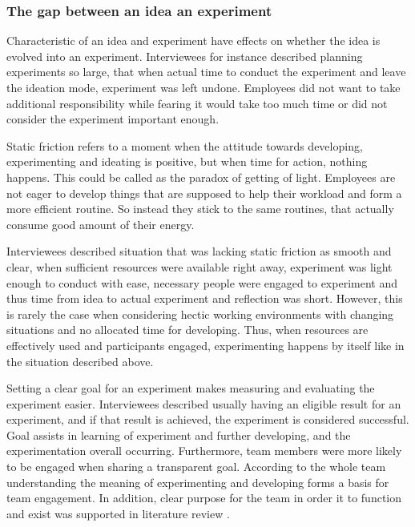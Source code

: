 \subsubsection*{The gap between an idea an experiment}
Characteristic of an idea and experiment have effects on whether the idea is evolved into an experiment. Interviewees for instance described planning experiments so large, that when actual time to conduct the experiment and leave the ideation mode, experiment was left undone. Employees did not want to take additional responsibility while fearing it would take too much time or did not consider the experiment important enough.

Static friction refers to a moment when the attitude towards developing, experimenting and ideating is positive, but when time for action, nothing happens. This could be called as the paradox of getting of light. Employees are not eager to develop things that are supposed to help their workload and form a more efficient routine. So instead they stick to the same routines, that actually consume good amount of their energy.

Interviewees described situation that was lacking static friction as smooth and clear, when sufficient resources were available right away, experiment was light enough to conduct with ease, necessary people were engaged to experiment and thus time from idea to actual experiment and reflection was short. However, this is rarely the case when considering hectic working environments with changing situations and no allocated time for developing.
Thus, when resources are effectively used and participants engaged, experimenting happens by itself like in the situation described above. 

Setting a clear goal for an experiment makes measuring and evaluating the experiment easier. Interviewees described usually having an eligible result for an experiment, and if that result is achieved, the experiment is considered successful. Goal assists in learning of experiment and further developing, and the experimentation overall occurring. Furthermore, team members were more likely to be engaged when sharing a transparent goal. According to \citet{thomke2001enlightened} the whole team understanding the meaning of experimenting and developing forms a basis for team engagement. In addition, clear purpose for the team in order it to function and exist was supported in literature review \citep{katzenbach1993wisdom}.

